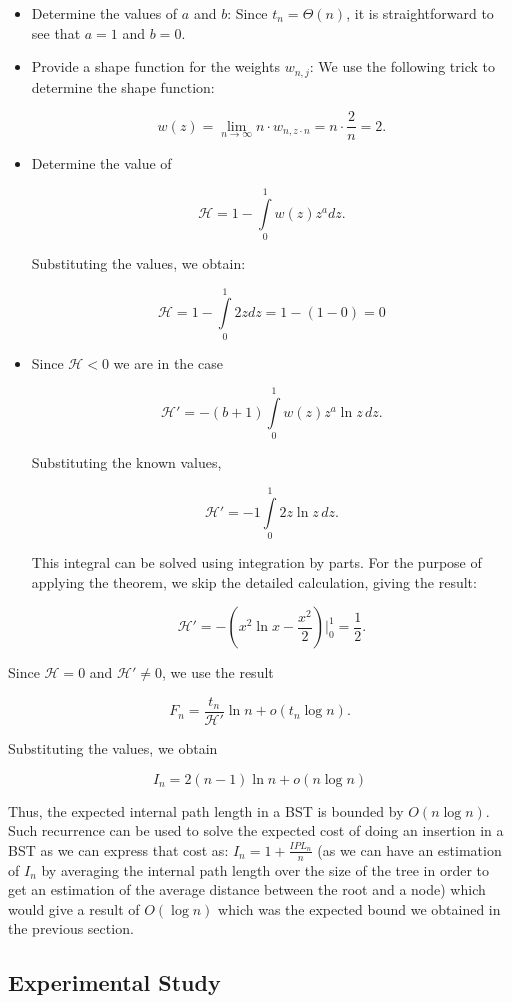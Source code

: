 \begin{itemize}
    \item Determine the values of \( a \) and \( b \): Since \( t_n = \Theta(n) \), it is straightforward to see that $a = 1$ and $b = 0$.
    \item Provide a shape function for the weights \( w_{n,j} \): We use the following trick to determine the shape function:

    \[
    w(z) = \lim\limits_{n\to\infty} n \cdot w_{n,z\cdot n} = n \cdot \frac{2}{n} = 2.
    \]

    \item Determine the value of 

    \[
    \mathcal{H} = 1 - \int\limits_{0}^{1} w(z) z^a dz.
    \]

    Substituting the values, we obtain:

    \[
    \mathcal{H} = 1 - \int\limits_{0}^{1} 2z dz = 1 - (1 - 0) = 0
    \]

    \item Since \( \mathcal{H} < 0 \) we are in the case

    \[
    \mathcal{H'} = -(b+1) \int\limits_{0}^{1} w(z) z^a \ln z \, dz.
    \]

    Substituting the known values,

    \[
    \mathcal{H'} = -1 \int\limits_{0}^{1} 2z \ln z \, dz.
    \]

    This integral can be solved using integration by parts. For the purpose of applying the theorem, we skip the detailed calculation, giving the result:

    \[
    \mathcal{H'} = - (x^2 \ln x - \frac{x^2}{2})\Big|_0^1 = \frac{1}{2}.
    \]

\end{itemize}

Since \( \mathcal{H} = 0 \) and \( \mathcal{H'} \neq 0 \), we use the result

\[
F_n = \frac{t_n}{\mathcal{H'}} \ln n + o(t_n \log n).
\]

Substituting the values, we obtain

\[
I_n = 2(n-1) \ln n + o(n \log n)
\]

Thus, the expected internal path length in a BST is bounded by \( O(n \log n) \). Such recurrence can be used to solve the expected cost of doing an insertion in a BST as we can express that cost as: $I_n = 1 + \frac{IPL_n}{n}$ (as we can have an estimation of $I_n$ by averaging the internal path length over the size of the tree in order to get an estimation of the average distance between the root and a node) which would give a result of $O(\log n)$ which was the expected bound we obtained in the previous section.

\subsection{Experimental Study}
